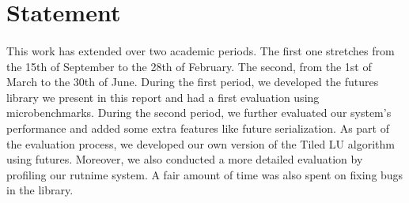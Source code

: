 \section*{Statement}
\paragraph{}
This work has extended over two academic periods.  The first one stretches 
from the 15th of September to the 28th of February.  The second, from the
1st of March to the 30th of June.  During the first period, we developed the futures 
library we present in this report and had a first evaluation using microbenchmarks.
During the second period, we further evaluated our system's performance and added some
extra features like future serialization. 
As part of the
evaluation process, we developed our own version of the Tiled LU algorithm using futures.
Moreover, we also conducted a more detailed evaluation by profiling our rutnime
system.  A fair amount of time was also spent on fixing bugs in the library.

